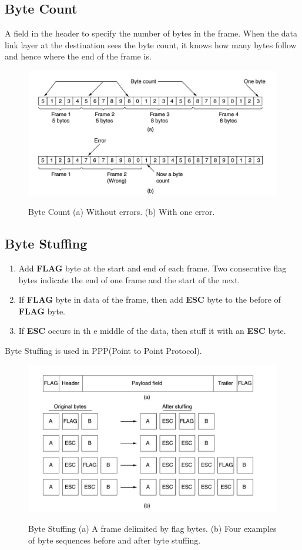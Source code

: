 \documentclass[a4paper,oneside]{book}
\begin{document}
\subsection{Byte Count}
A field in the header to specify the number of bytes in the frame. When the data link layer at the destination sees the byte count, it knows how many bytes follow and hence where the end of the frame is.
\begin{figure}[H]
\caption{Byte Count  (a) Without errors. (b) With one error.}
\includegraphics[scale=0.6]{Images/byte_count}
\label{fig:cn_byte_count}
\end{figure}
\subsection{Byte Stuffing}
\begin{enumerate}
\item Add \textbf{FLAG} byte at the start and end of each frame. Two consecutive flag bytes indicate the end of one frame and the start of the next. 
\item If \textbf{FLAG} byte in data of the frame, then add \textbf{ESC} byte to the before of \textbf{FLAG} byte.
\item If \textbf{ESC} occurs in th e middle of the data,  then stuff it with an \textbf{ESC} byte.
\end{enumerate}
Byte Stuffing is used in PPP(Point to Point Protocol).
\begin{figure}[H]
\caption{Byte Stuffing  (a) A frame delimited by flag bytes. (b) Four examples of byte sequences before and after byte stuffing.}
\includegraphics[scale=0.6]{Images/byte_stuffing}
\label{fig:cn_byte_stuff}
\end{figure}
\end{document}
